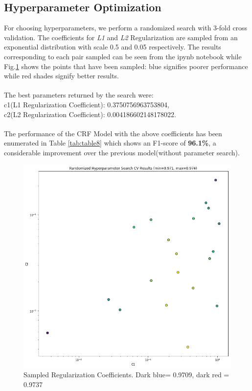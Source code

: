 \documentclass[12pt]{article}
\begin{document}
\subsection{Hyperparameter Optimization}
For choosing hyperparameters, we perform a randomized search with 3-fold cross validation. The coefficients for \textit{L1} and \textit{L2} Regularization are sampled from an exponential distribution with scale 0.5 and 0.05 respectively.
The results corresponding to each pair sampled can be seen from the ipynb notebook while Fig.\ref{fig:plot1} shows the points that have been sampled: blue signifies poorer performance while red shades signify better results.\\
\\
The best parameters returned by the search were:\\
c1(L1 Regularization Coefficient): 0.3750756963753804, \\c2(L2 Regularization Coefficient): 0.004186602148178022.\\
\\
The performance of the CRF Model with the above coefficients has been enumerated in Table \ref{tab:table8} which shows an F1-score of \textsc{\textbf{96.1\%}}, a considerable improvement over the previous model(without parameter search).
\begin{figure}[h!]
  \includegraphics[width=10 cm]{plot.png}
  \caption{Sampled Regularization Coefficients. Dark blue= 0.9709, dark red = 0.9737}
  \label{fig:plot1}
\end{figure}
\end{document}
